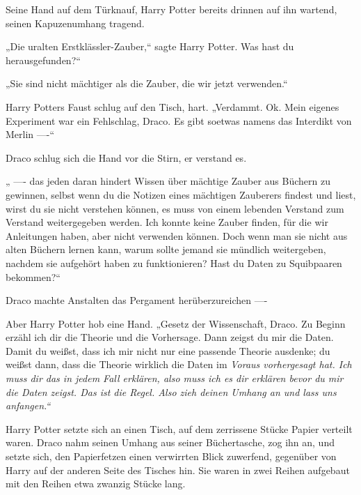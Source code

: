 {Seine Hand auf dem Türknauf, Harry Potter bereits drinnen auf ihn wartend, seinen Kapuzenumhang tragend.

„Die uralten Erstklässler-Zauber,“ sagte Harry Potter. Was hast du herausgefunden?“

„Sie sind nicht mächtiger als die Zauber, die wir jetzt verwenden.“

Harry Potters Faust schlug auf den Tisch, hart. „Verdammt. Ok. Mein eigenes Experiment war ein Fehlschlag, Draco. Es gibt soetwas namens das Interdikt von Merlin ----“

Draco schlug sich die Hand vor die Stirn, er verstand es.

„ ---- das jeden daran hindert Wissen über mächtige Zauber aus Büchern zu gewinnen, selbst wenn du die Notizen eines mächtigen Zauberers findest und liest, wirst du sie nicht verstehen können, es muss von einem lebenden Verstand zum Verstand weitergegeben werden. Ich konnte keine Zauber finden, für die wir Anleitungen haben, aber nicht verwenden können. Doch wenn man sie nicht aus alten Büchern lernen kann, warum sollte jemand sie mündlich weitergeben, nachdem sie aufgehört haben zu funktionieren? Hast du Daten zu Squibpaaren bekommen?“

Draco machte Anstalten das Pergament herüberzureichen ----

Aber Harry Potter hob eine Hand. „Gesetz der Wissenschaft, Draco. Zu Beginn erzähl ich dir die Theorie und die Vorhersage. Dann zeigst du mir die Daten. Damit du weißst, dass ich mir nicht nur eine passende Theorie ausdenke; du weißst dann, dass die Theorie wirklich die Daten im \emph{Voraus vorhergesagt hat. Ich muss dir das in jedem Fall erklären, also muss ich es dir erklären \emph{bevor} du mir die Daten zeigst. Das ist die Regel. Also zieh deinen Umhang an und lass uns anfangen.“}

Harry Potter setzte sich an einen Tisch, auf dem zerrissene Stücke Papier verteilt waren. Draco nahm seinen Umhang aus seiner Büchertasche, zog ihn an, und setzte sich, den Papierfetzen einen verwirrten Blick zuwerfend, gegenüber von Harry auf der anderen Seite des Tisches hin. Sie waren in zwei Reihen aufgebaut mit den Reihen etwa zwanzig Stücke lang.

}
